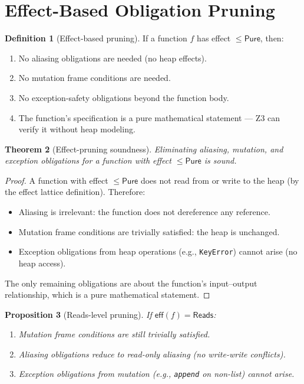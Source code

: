 \documentclass[11pt,a4paper]{report}
\theoremstyle{definition}
\newtheorem{definition}{Definition}[chapter]
\theoremstyle{plain}
\newtheorem{theorem}[definition]{Theorem}
\newtheorem{proposition}[definition]{Proposition}
\newcommand{\Pure}{\mathsf{Pure}}
\newcommand{\Reads}{\mathsf{Reads}}
\begin{document}
\section{Effect-Based Obligation Pruning}
\label{sec:effect-pruning}

\begin{definition}[Effect-based pruning]
If a function $f$ has effect $\leq \Pure$, then:
\begin{enumerate}
  \item No aliasing obligations are needed (no heap effects).
  \item No mutation frame conditions are needed.
  \item No exception-safety obligations beyond the function body.
  \item The function's specification is a pure mathematical statement ---
    Z3 can verify it without heap modeling.
\end{enumerate}
\end{definition}

\begin{theorem}[Effect-pruning soundness]
Eliminating aliasing, mutation, and exception obligations for a function
with effect $\leq \Pure$ is sound.
\end{theorem}
\begin{proof}
A function with effect $\leq \Pure$ does not read from or write to the heap
(by the effect lattice definition).  Therefore:
\begin{itemize}
  \item Aliasing is irrelevant: the function does not dereference any reference.
  \item Mutation frame conditions are trivially satisfied: the heap is unchanged.
  \item Exception obligations from heap operations (e.g., \lstinline[style=python]{KeyError})
    cannot arise (no heap access).
\end{itemize}
The only remaining obligations are about the function's input--output relationship,
which is a pure mathematical statement.
\end{proof}

\begin{proposition}[Reads-level pruning]
If $\mathsf{eff}(f) = \Reads$:
\begin{enumerate}
  \item Mutation frame conditions are still trivially satisfied.
  \item Aliasing obligations reduce to \emph{read-only} aliasing (no write-write conflicts).
  \item Exception obligations from mutation (e.g., \lstinline[style=python]{append} on
    non-list) cannot arise.
\end{enumerate}
\end{proposition}
\end{document}
